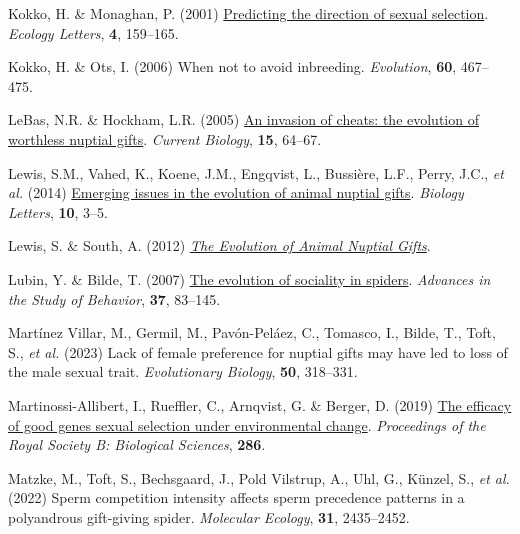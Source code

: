 \documentclass[
]{article}
\newlength{\cslhangindent}
\newlength{\cslentryspacingunit} %
\newenvironment{CSLReferences}[2] %
 {%
  \setlength{\parindent}{0pt}
  \ifodd #1
  \let\oldpar\par
  \def\par{\hangindent=\cslhangindent\oldpar}
  \fi
  \setlength{\parskip}{#2\cslentryspacingunit}
 }%
 {}
\begin{document}
\begin{CSLReferences}{0}{0}
\leavevmode{}%
Kokko, H. \& Monaghan, P. (2001)
\href{https://doi.org/10.1046/j.1461-0248.2001.00212.x}{{Predicting the
direction of sexual selection}}. \emph{Ecology Letters}, \textbf{4},
159--165.

\leavevmode{}%
Kokko, H. \& Ots, I. (2006) {When not to avoid inbreeding}.
\emph{Evolution}, \textbf{60}, 467--475.

\leavevmode{}%
LeBas, N.R. \& Hockham, L.R. (2005) \href{https://doi.org/10.1016/j}{{An
invasion of cheats: the evolution of worthless nuptial gifts}}.
\emph{Current Biology}, \textbf{15}, 64--67.

\leavevmode{}%
Lewis, S.M., Vahed, K., Koene, J.M., Engqvist, L., Bussière, L.F.,
Perry, J.C., \emph{et al.} (2014)
\href{https://doi.org/10.1098/rsbl.2014.0336}{{Emerging issues in the
evolution of animal nuptial gifts}}. \emph{Biology Letters},
\textbf{10}, 3--5.

\leavevmode{}%
Lewis, S. \& South, A. (2012)
\emph{\href{https://doi.org/10.1016/B978-0-12-394288-3.00002-2}{{The
Evolution of Animal Nuptial Gifts}}}.

\leavevmode{}%
Lubin, Y. \& Bilde, T. (2007)
\href{https://doi.org/10.1016/S0065-3454(07)37003-4}{{The evolution of
sociality in spiders}}. \emph{Advances in the Study of Behavior},
\textbf{37}, 83--145.

\leavevmode{}%
Martínez Villar, M., Germil, M., Pavón-Peláez, C., Tomasco, I., Bilde,
T., Toft, S., \emph{et al.} (2023) Lack of female preference for nuptial
gifts may have led to loss of the male sexual trait. \emph{Evolutionary
Biology}, \textbf{50}, 318--331.

\leavevmode{}%
Martinossi-Allibert, I., Rueffler, C., Arnqvist, G. \& Berger, D. (2019)
\href{https://doi.org/10.1098/rspb.2018.2313}{The efficacy of good genes
sexual selection under environmental change}. \emph{Proceedings of the
Royal Society B: Biological Sciences}, \textbf{286}.

\leavevmode{}%
Matzke, M., Toft, S., Bechsgaard, J., Pold Vilstrup, A., Uhl, G.,
Künzel, S., \emph{et al.} (2022) Sperm competition intensity affects
sperm precedence patterns in a polyandrous gift-giving spider.
\emph{Molecular Ecology}, \textbf{31}, 2435--2452.


\end{CSLReferences}
\end{document}
